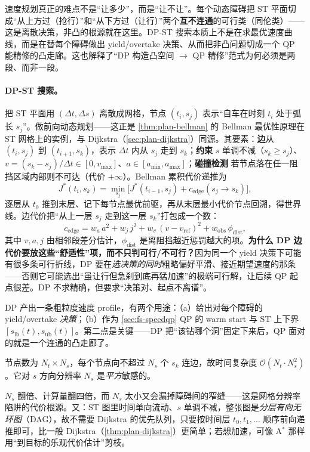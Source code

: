 \begin{insight}
速度规划真正的难点不是“让多少”，而是“让不让”。每个动态障碍把 ST 平面切成“从上方过（抢行）”和“从下方过（让行）”两个\textbf{互不连通}的可行类（同伦类）——这是离散决策，非凸的根源就在这里。DP-ST 搜索本质上不是在求最优速度曲线，而是在替每个障碍做出 yield/overtake 决策、从而把非凸问题切成一个 QP 能精修的凸走廊。这也解释了“DP 构造凸空间 $\to$ QP 精修”范式为何必须是两段、而非一段。
\end{insight}

\paragraph{DP-ST 搜索。}
把 ST 平面用 $(\Delta t,\Delta s)$ 离散成网格，节点 $(t_i,s_j)$ 表示“自车在时刻 $t_i$ 处于弧长 $s_j$”。做前向动态规划——这正是 \cref{thm:plan-bellman} 的 Bellman 最优性原理在 ST 网格上的实例，与 Dijkstra（\cref{sec:plan-dijkstra}）同源。其要素：\textbf{边}从 $(t_i,s_j)$ 到 $(t_{i+1},s_k)$，表示 $\Delta t$ 内从 $s_j$ 走到 $s_k$；\textbf{约束} $s$ 单调不减（$s_k\ge s_j$）、$v=(s_k-s_j)/\Delta t\in[0,v_{\max}]$、$a\in[a_{\min},a_{\max}]$；\textbf{碰撞检测} 若节点落在任一阻挡区域内部则不可达（代价 $+\infty$）。Bellman 累积代价递推为
\begin{equation}
  J^*(t_i,s_k)=\min_{s_j}\Big[J^*(t_{i-1},s_j)+c_{\mathrm{edge}}(s_j\to s_k)\Big],
  \label{eq:fs-dp-bellman}
\end{equation}
逐层从 $t_0$ 推到末层、记下每节点最优前驱，再从末层最小代价节点回溯，得世界线。边代价把“从上一层 $s_j$ 走到这一层 $s_k$”打包成一个数：
\begin{equation}
  c_{\mathrm{edge}}=w_a\,a^2+w_j\,j^2+w_v\,(v-v_{\mathrm{ref}})^2+w_{\mathrm{obs}}\,\phi_{\mathrm{dist}},
  \label{eq:fs-edge-cost}
\end{equation}
其中 $v,a,j$ 由相邻段差分估计，$\phi_{\mathrm{dist}}$ 是离阻挡越近惩罚越大的项。\textbf{为什么 DP 边代价要放这些“舒适性”项，而不只判可行/不可行？}因为同一个 yield 决策下可能有很多条可行折线，DP 要在\emph{选决策的同时}粗略偏好平滑、接近期望速度的那条——否则它可能选出“虽让行但急刹到底再猛加速”的极端可行解，让后续 QP 起点很差。DP 不求精确，但要求“决策对、起点不离谱”。

DP 产出一条粗粒度速度 profile，有两个用途：（a）给出对每个障碍的 yield/overtake \emph{决策}；（b）作为 \cref{sec:fs-speedqp} QP 的 warm start 与 ST 上下界 $[s_{\mathrm{lb}}(t),s_{\mathrm{ub}}(t)]$。第二点是关键——DP 把“该钻哪个洞”固定下来后，QP 面对的就是一个连通的凸走廊了。

\begin{theorem}[DP-ST 复杂度]\label{thm:fs-dp-complexity}
节点数为 $N_t\times N_s$，每个节点向不超过 $N_s$ 个 $s_k$ 连边，故时间复杂度 $\mathcal{O}(N_t\cdot N_s^2)$。它对 $s$ 方向分辨率 $N_s$ 是\emph{平方}敏感的。
\end{theorem}
\begin{note}
$N_s$ 翻倍、计算量翻四倍，而 $N_s$ 太小又会漏掉障碍间的窄缝——这是网格分辨率陷阱的代价根源。又：ST 图里时间单向流动、$s$ 单调不减，整张图是\emph{分层有向无环图}（DAG），故不需要 Dijkstra 的优先队列，只要按时间层 $t_0,t_1,\dots$ 顺序前向递推即可，比一般 Dijkstra（\cref{thm:plan-dijkstra}）更简单；若想加速，可像 A$^*$ 那样用“到目标的乐观代价估计”剪枝。
\end{note}

